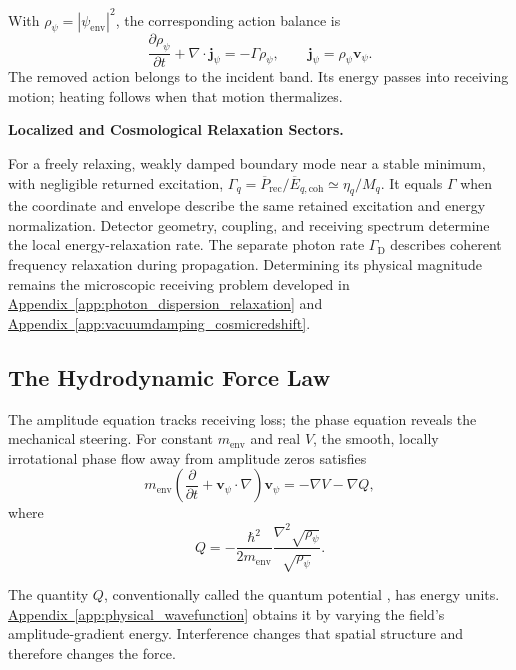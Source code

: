 With $\rho_\psi=|\psi_{\mathrm{env}}|^2$, the corresponding action balance is
\begin{equation}
    \frac{\partial\rho_\psi}{\partial t}
    +\nabla\cdot\mathbf j_\psi
    =
    -\Gamma\rho_\psi,
    \qquad
    \mathbf j_\psi=\rho_\psi\mathbf v_\psi.
\end{equation}
The removed action belongs to the incident band. Its energy passes into receiving motion; heating follows when that motion thermalizes.

\medskip
\noindent\textbf{Localized and Cosmological Relaxation Sectors.}

For a freely relaxing, weakly damped boundary mode near a stable minimum, with negligible returned excitation,
$\Gamma_q=\overline{P}_{\mathrm{rec}}/\overline{E}_{q,\mathrm{coh}}\simeq\eta_q/M_q$.
It equals $\Gamma$ when the coordinate and envelope describe the same retained excitation and energy normalization. Detector geometry, coupling, and receiving spectrum determine the local energy-relaxation rate. The separate photon rate $\Gamma_{\mathrm D}$ describes coherent frequency relaxation during propagation. Determining its physical magnitude remains the microscopic receiving problem developed in \hyperref[app:photon_dispersion_relaxation]{Appendix~\ref*{app:photon_dispersion_relaxation}} and \hyperref[app:vacuumdamping_cosmicredshift]{Appendix~\ref*{app:vacuumdamping_cosmicredshift}}.


\subsection{The Hydrodynamic Force Law}

The amplitude equation tracks receiving loss; the phase equation reveals the mechanical steering. For constant $m_{\mathrm{env}}$ and real $V$, the smooth, locally irrotational phase flow away from amplitude zeros satisfies
\begin{equation}
    m_{\mathrm{env}}
    \left(
        \frac{\partial}{\partial t}
        +\mathbf v_\psi\cdot\nabla
    \right)\mathbf v_\psi
    =
    -\nabla V-\nabla Q,
\end{equation}
where
\begin{equation}
    Q
    =
    -\frac{\hbar^2}{2m_{\mathrm{env}}}
    \frac{\nabla^2\sqrt{\rho_\psi}}{\sqrt{\rho_\psi}}.
\end{equation}

The quantity $Q$, conventionally called the quantum potential \cite{Bohm_1952}, has energy units. \hyperref[app:physical_wavefunction]{Appendix~\ref*{app:physical_wavefunction}} obtains it by varying the field's amplitude-gradient energy. Interference changes that spatial structure and therefore changes the force.

